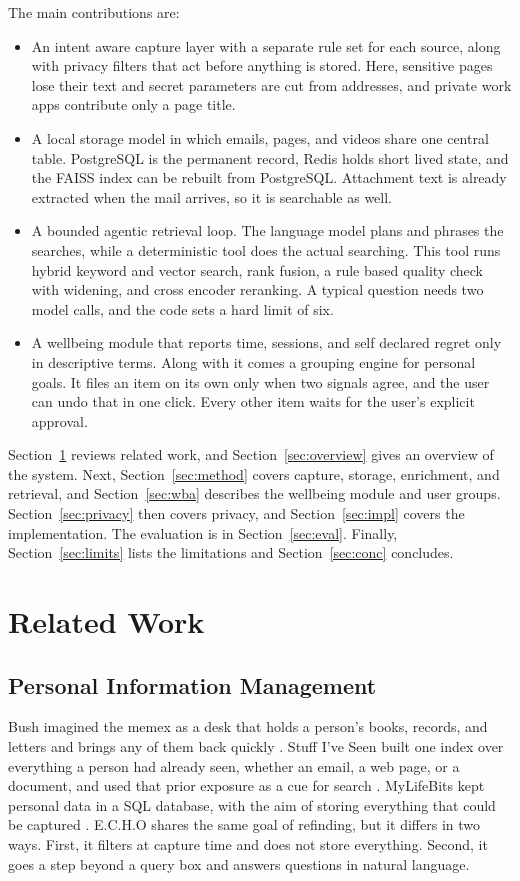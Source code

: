 \documentclass[conference]{IEEEtran}
\begin{document}
The main contributions are:
\begin{itemize}
\item An intent aware capture layer with a separate rule set for each source, along with privacy filters that act before anything is stored. Here, sensitive pages lose their text and secret parameters are cut from addresses, and private work apps contribute only a page title.
\item A local storage model in which emails, pages, and videos share one central table. PostgreSQL is the permanent record, Redis holds short lived state, and the FAISS index can be rebuilt from PostgreSQL. Attachment text is already extracted when the mail arrives, so it is searchable as well.
\item A bounded agentic retrieval loop. The language model plans and phrases the searches, while a deterministic tool does the actual searching. This tool runs hybrid keyword and vector search, rank fusion, a rule based quality check with widening, and cross encoder reranking. A typical question needs two model calls, and the code sets a hard limit of six.
\item A wellbeing module that reports time, sessions, and self declared regret only in descriptive terms. Along with it comes a grouping engine for personal goals. It files an item on its own only when two signals agree, and the user can undo that in one click. Every other item waits for the user's explicit approval.
\end{itemize}

Section~\ref{sec:related} reviews related work, and Section~\ref{sec:overview} gives an overview of the system. Next, Section~\ref{sec:method} covers capture, storage, enrichment, and retrieval, and Section~\ref{sec:wba} describes the wellbeing module and user groups. Section~\ref{sec:privacy} then covers privacy, and Section~\ref{sec:impl} covers the implementation. The evaluation is in Section~\ref{sec:eval}. Finally, Section~\ref{sec:limits} lists the limitations and Section~\ref{sec:conc} concludes.

\section{Related Work}\label{sec:related}
\subsection{Personal Information Management}
Bush imagined the memex as a desk that holds a person's books, records, and letters and brings any of them back quickly \cite{b1}. Stuff I've Seen built one index over everything a person had already seen, whether an email, a web page, or a document, and used that prior exposure as a cue for search \cite{b2}. MyLifeBits kept personal data in a SQL database, with the aim of storing everything that could be captured \cite{b3}. E.C.H.O shares the same goal of refinding, but it differs in two ways. First, it filters at capture time and does not store everything. Second, it goes a step beyond a query box and answers questions in natural language.
\end{document}
